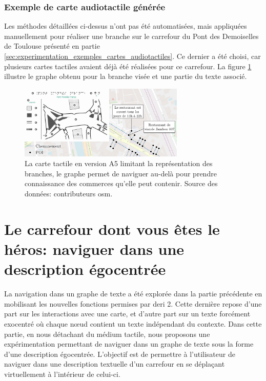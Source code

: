 \subsubsection{Exemple de carte audiotactile générée}

Les méthodes détaillées ci-dessus n'ont pas été automatisées, mais appliquées manuellement pour réaliser une branche sur le carrefour du Pont des Demoiselles de Toulouse présenté en partie \ref{sec:experimentation_exemples_cartes_audiotactiles}. Ce dernier a été choisi, car plusieurs cartes tactiles avaient déjà été réalisées pour ce carrefour. La figure \ref{fig:experimentation_deri2_exemple_carte} illustre le graphe obtenu pour la branche visée et une partie du texte associé. 

\begin{figure}[ht]
    \centering
    \includegraphics[width=0.7\textwidth]{images/experimentation/exemple_poc2.pdf}
    \caption[Carte tactile A5 et graphe de description de branche]{La carte tactile en version A5 limitant la représentation des branches, le graphe permet de naviguer au-delà pour prendre connaissance des commerces qu'elle peut contenir. Source des données: contributeurs \gls{osm}.}
    \label{fig:experimentation_deri2_exemple_carte}
\end{figure}

\section{Le carrefour dont vous êtes le héros: naviguer dans une description égocentrée}

\label{sec:experimentation_le_carrefour_dont_vous_etes_le_heros}

La navigation dans un graphe de texte a été explorée dans la partie précédente en mobilisant les nouvelles fonctions permises par \gls{deri} 2. Cette dernière repose d'une part sur les interactions avec une carte, et d'autre part sur un texte forcément exocentré où chaque nœud contient un texte indépendant du contexte. Dans cette partie, en nous détachant du médium tactile, nous proposons une expérimentation permettant de naviguer dans un graphe de texte sous la forme d'une description égocentrée. L'objectif est de permettre à l'utilisateur de naviguer dans une description textuelle d'un carrefour en se déplaçant virtuellement à l'intérieur de celui-ci. 

